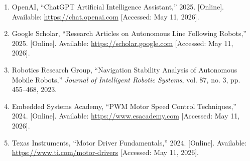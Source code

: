 \documentclass[12pt,a4paper,oneside]{report}
\begin{document}
\begin{enumerate}
\item OpenAI,
“ChatGPT Artificial Intelligence Assistant,”
2025.
[Online]. Available:
\url{https://chat.openai.com}
[Accessed: May 11, 2026].

\item Google Scholar,
“Research Articles on Autonomous Line Following Robots,”
2025.
[Online]. Available:
\url{https://scholar.google.com}
[Accessed: May 11, 2026].

\item Robotics Research Group,
“Navigation Stability Analysis of Autonomous Mobile Robots,”
\textit{Journal of Intelligent Robotic Systems},
vol. 87, no. 3, pp. 455--468, 2023.

\item Embedded Systems Academy,
“PWM Motor Speed Control Techniques,”
2024.
[Online]. Available:
\url{https://www.esacademy.com}
[Accessed: May 11, 2026].

\item Texas Instruments,
“Motor Driver Fundamentals,”
2024.
[Online]. Available:
\url{https://www.ti.com/motor-drivers}
[Accessed: May 11, 2026].

\end{enumerate}
\end{document}
